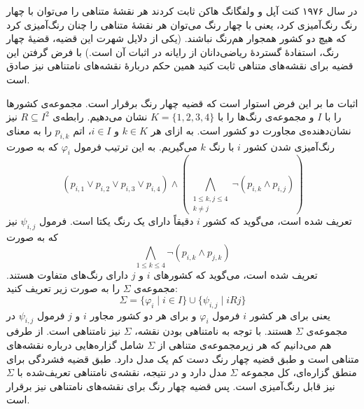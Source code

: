 در سال ۱۹۷۶ کنت آپل و ولفگانگ هاکن ثابت کردند هر نقشهٔ متناهی را می‌توان با چهار رنگ رنگ‌آمیزی کرد، یعنی با چهار رنگ می‌توان هر نقشهٔ متناهی را چنان رنگ‌آمیزی کرد که هیچ دو کشور همجوار هم‌رنگ نباشند. (یکی از دلایل شهرت این قضیه، قضیهٔ چهار رنگ، استفادهٔ گستردهٔ ریاضی‌دانان از رایانه در اثبات آن است.) با فرض گرفتن این قضیه برای نقشه‌های متناهی ثابت کنید همین حکم دربارهٔ نقشه‌های نامتناهی نیز صادق است.
\begin{ans}
    اثبات ما بر این فرض استوار است که قضیه چهار رنگ برقرار است. مجموعه‌ی کشورها را با $I$ و مجموعه‌ی رنگ‌ها را با $K = \{1, 2, 3, 4\}$ نشان می‌دهیم. رابطه‌ی $R \subseteq I^2$ نیز نشان‌دهنده‌ی مجاورت دو کشور است. به ازای هر $k \in K$ و $i \in I$، اتم $p_{i,k}$ را به معنای رنگ‌آمیزی شدن کشور $i$ با رنگ $k$ می‌گیریم.
    به این ترتیب فرمول $\varphi_i$ که به صورت
    \[ (p_{i,1} \vee p_{i,2} \vee p_{i,3} \vee p_{i,4}) \land (\bigwedge_{\substack{1 \le k, j \le 4 \\ k \neq j}} \neg(p_{i,k} \wedge p_{i,j})) \]
    تعریف شده است، می‌گوید که کشور $i$ دقیقاً دارای یک رنگ یکتا است. فرمول $\psi_{i, j}$ نیز که به صورت
    \[ \bigwedge_{1 \le k \le 4} \neg (p_{i,k} \wedge p_{j,k}) \]
    تعریف شده است، می‌گوید که کشورهای $i$ و $j$ دارای رنگ‌های متفاوت هستند. مجموعه‌ی $\Sigma$ را به صورت زیر تعریف کنید:
    \[ \Sigma = \{ \varphi_i  \mid i \in I \} \cup \{ \psi_{i, j} \mid i R j \} \]
    یعنی برای هر کشور $i$ فرمول $\varphi_i$ و برای هر دو کشور مجاور $i$ و $j$ فرمول $\psi_{i, j}$ در مجموعه‌ی $\Sigma$ هستند. با توجه به نامتناهی بودن نقشه، $\Sigma$ نیز نامتناهی است. از طرفی هم می‌دانیم که هر زیرمجموعه‌ی متناهی از $\Sigma$ شامل گزاره‌هایی درباره نقشه‌های متناهی است و طبق قضیه چهار رنگ دست کم یک مدل دارد. طبق قضیه فشردگی برای منطق گزاره‌ای، کل مجموعه $\Sigma$ مدل دارد و در نتیجه، نقشه‌ی نامتناهی تعریف‌شده با $\Sigma$ نیز قابل رنگ‌آمیزی است. پس قضیه چهار رنگ برای نقشه‌های نامتناهی نیز برقرار است.
\end{ans}
